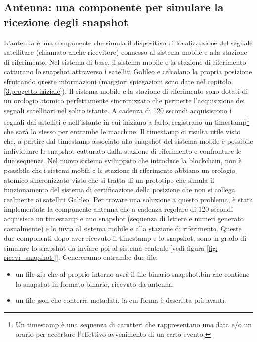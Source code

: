 \subsection{Antenna: una componente per simulare la ricezione degli snapshot}
L'antenna è una componente che simula il dispositivo di localizzazione del segnale satellitare (chiamato anche ricevitore) connesso al sistema mobile e alla stazione di riferimento. Nel sistema di base, il sistema mobile e la stazione di riferimento catturano lo snapshot attraverso i satelliti Galileo e calcolano la propria posizione sfruttando queste informazioni (maggiori spiegazioni sono date nel capitolo \ref{3.progetto iniziale}). Il sistema mobile e la stazione di riferimento sono dotati di un orologio atomico perfettamente sincronizzato che permette l'acquisizione dei segnali satellitari nel solito istante. A cadenza di 120 secondi acquisiscono i segnali dai satelliti e nell'istante in cui iniziano a farlo, registrano un timestamp\footnote{Un timestamp è una sequenza di caratteri che rappresentano una data e/o un orario per accertare l’effettivo avvenimento di un certo evento.} che sarà lo stesso per entrambe le macchine. Il timestamp ci risulta utile visto che, a partire dal timestamp associato allo snapshot del sistema mobile è possibile individuare lo snapshot catturato dalla stazione di riferimento e confrontare le due sequenze. Nel nuovo sistema sviluppato che introduce la blockchain, non è possibile che i sistemi mobili e le stazione di riferimento abbiano un orologio atomico sincronizzato visto che si tratta di un prototipo che simula il funzionamento del sistema di certificazione della posizione che non si collega realmente ai satelliti Galileo. Per trovare una soluzione a questo problema, è stata implementata la componente antenna che a cadenza regolare di 120 secondi acquisisce un timestamp e uno snapshot (sequenza di lettere e numeri generato casualmente) e lo invia al sistema mobile e alla stazione di riferimento. Queste due componenti dopo aver ricevuto il timestamp e lo snapshot, sono in grado di simulare lo snapshot da inviare poi al sistema centrale [vedi figura \ref{fig: ricevi_snapshot }]. Genereranno entrambe due file: 
\begin{itemize}
    \item un file zip che al proprio interno avrà il file binario snapshot.bin che contiene lo snapshot in formato binario, ricevuto da antenna.
    \item un file json che conterrà metadati, la cui forma è descritta più avanti.
\end{itemize}

